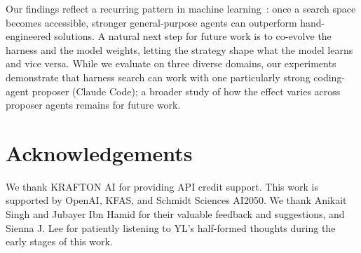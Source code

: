 \documentclass{article}
\begin{document}
Our findings reflect a recurring pattern in machine learning~\citep{sutton2019bitter}: once a search space becomes accessible, stronger general-purpose agents can outperform hand-engineered solutions.
A natural next step for future work is to co-evolve the harness and the model weights, letting the strategy shape what the model learns and vice versa.
While we evaluate on three diverse domains, our experiments demonstrate that harness search can work with one particularly strong coding-agent proposer (Claude Code); a broader study of how the effect varies across proposer agents remains for future work.



\clearpage
\section*{Acknowledgements}
We thank KRAFTON AI for providing API credit support.
This work is supported by OpenAI, KFAS, and Schmidt Sciences AI2050.
We thank Anikait Singh and Jubayer Ibn Hamid for their valuable feedback and suggestions, and Sienna J. Lee for patiently listening to YL's half-formed thoughts during the early stages of this work.





\end{document}
